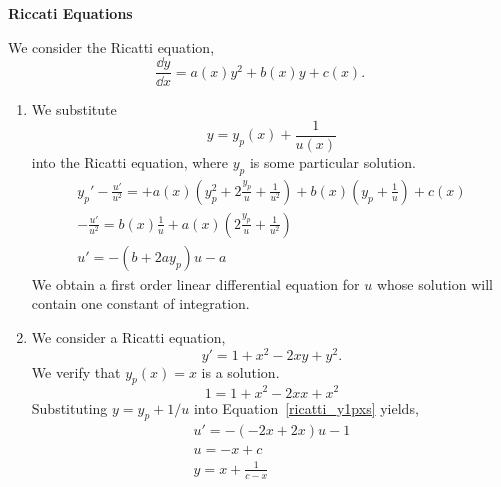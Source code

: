 {%
\begin{large}
  \noindent
  \textbf{Riccati Equations}
\end{large}


\begin{Solution}
  \label{solution riccati 2 methods}
  We consider the Ricatti equation,
  \begin{equation}
    \label{gen_ricatti}
    \frac{\dd y}{\dd x} = a(x) y^2 + b(x) y + c(x).
  \end{equation}
  \begin{enumerate}
  \item
    We substitute 
    \[
    y = y_p(x) + \frac{1}{u(x)}
    \]
    into the Ricatti equation, where $y_p$ is some particular solution.
    \begin{gather*}
      y_p' - \frac{u'}{u^2} = 
      + a(x) \left( y_p^2 + 2 \frac{y_p}{u} + \frac{1}{u^2} \right)
      + b(x) \left( y_p + \frac{1}{u} \right) + c(x) \\
      - \frac{u'}{u^2} = b(x) \frac{1}{u} 
      + a(x) \left( 2 \frac{y_p}{u} + \frac{1}{u^2} \right) \\
      \boxed{
        u' = - \left( b + 2 a y_p \right) u - a
        }
    \end{gather*}
    We obtain a first order linear differential equation for $u$ whose solution
    will contain one constant of integration.
  \item
    We consider a Ricatti equation,
    \begin{equation}
      \label{ricatti_y1pxs}
      y' = 1 + x^2 - 2 x y + y^2.
    \end{equation}
    We verify that $y_p(x) = x$ is a solution.
    \[
    1 = 1 + x^2 - 2 x x + x^2
    \]
    Substituting $y = y_p + 1/u$ into Equation~\ref{ricatti_y1pxs} yields,
    \begin{gather*}
      u' = - \left( -2 x + 2 x \right) u - 1 \\
      u = - x + c \\
      \boxed{
        y = x + \frac{1}{c - x}
        }
    \end{gather*}


\end{enumerate}
\end{Solution}}
